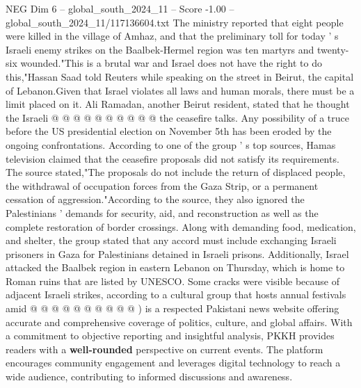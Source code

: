 \begin{textsample}{NEG Dim 6 – global\_south\_2024\_11 – Score -1.00 – global\_south\_2024\_11/117136604.txt}
The ministry reported that eight people were killed in the village of Amhaz, and that the preliminary toll for today ' s Israeli enemy strikes on the Baalbek-Hermel region was ten martyrs and twenty-six wounded."This is a brutal war and Israel does not have the right to do this,"Hassan Saad told Reuters while speaking on the street in Beirut, the capital of Lebanon.Given that Israel violates all laws and human morals, there must be a limit placed on it.
Ali Ramadan, another Beirut resident, stated that he thought the Israeli @ @ @ @ @ @ @ @ @ @ the ceasefire talks.
Any possibility of a truce before the US presidential election on November 5th has been eroded by the ongoing confrontations.
According to one of the group ' s top sources, Hamas television claimed that the ceasefire proposals did not satisfy its requirements.
The source stated,"The proposals do not include the return of displaced people, the withdrawal of occupation forces from the Gaza Strip, or a permanent cessation of aggression."According to the source, they also ignored the Palestinians ' demands for security, aid, and reconstruction as well as the complete restoration of border crossings.
Along with demanding food, medication, and shelter, the group stated that any accord must include exchanging Israeli prisoners in Gaza for Palestinians detained in Israeli prisons.
Additionally, Israel attacked the Baalbek region in eastern Lebanon on Thursday, which is home to Roman ruins that are listed by UNESCO.
Some cracks were visible because of adjacent Israeli strikes, according to a cultural group that hosts annual festivals amid @ @ @ @ @ @ @ @ @ @ ) is a respected Pakistani news website offering accurate and comprehensive coverage of politics, culture, and global affairs.
With a commitment to objective reporting and insightful analysis, PKKH provides readers with a \textbf{well-rounded} perspective on current events.
The platform encourages community engagement and leverages digital technology to reach a wide audience, contributing to informed discussions and awareness.

\end{textsample}

